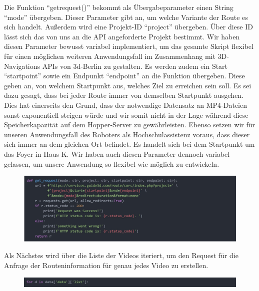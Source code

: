 Die Funktion “getrequest()” bekommt als Übergabeparameter einen String “mode” übergeben. Dieser Parameter gibt an, um welche Variante der Route es sich handelt. Außerdem wird eine Projekt-ID “project” übergeben. Über diese ID lässt sich das von uns an die API angeforderte Projekt bestimmt. Wir haben diesen Parameter bewusst variabel implementiert, um das gesamte Skript flexibel für einen möglichen weiteren Anwendungsfall im Zusammenhang mit 3D-Navigations APIs von 3d-Berlin zu gestalten. Es werden zudem ein Start “startpoint” sowie ein Endpunkt “endpoint” an die Funktion übergeben. Diese geben an, von welchem Startpunkt aus, welches Ziel zu erreichen sein soll. Es sei dazu gesagt, dass bei jeder Route immer von demselben Startpunkt ausgehen. Dies hat einerseits den Grund, dass der notwendige Datensatz an MP4-Dateien sonst exponentiell steigen würde und wir somit nicht in der Lage während diese Speicherkapazität auf dem Hopper-Server zu gewährleisten. Ebenso setzen wir für unseren Anwendungsfall des Roboters als Hochschulassistenz voraus, dass dieser sich immer an dem gleichen Ort befindet. Es handelt sich bei dem Startpunkt um das Foyer in Haus K. Wir haben auch diesen Parameter dennoch variabel gelassen, um unsere Anwendung so flexibel wie möglich zu entwickeln.

\begin{figure}[H]
    \includegraphics[width=\textwidth]{Figures/3DNavigator/code06.jpg}
    \centering
\end{figure} \vspace{-3.5mm}

Als Nächstes wird über die Liste der Videos iteriert, um den Request für die Anfrage der Routeninformation für genau jedes Video zu erstellen.

\begin{figure}[H]
    \includegraphics[width=\textwidth]{Figures/3DNavigator/code07.jpg}
    \centering
\end{figure} \vspace{-3.5mm}

